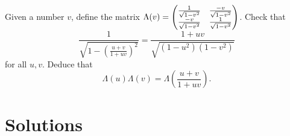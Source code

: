 \documentclass{article}
\begin{document}
\begin{Exercise}\label{exr:lorentz}
Given a number \(v\), define the matrix \(\Lambda(v)=\begin{pmatrix}
\frac{1}{\sqrt{1-v^2}} & \frac{-v}{\sqrt{1-v^2}}
\\ \frac{-v}{\sqrt{1-v^2}} & \frac{1}{\sqrt{1-v^2}}\end{pmatrix}\). Check that
\[\frac{1}{\sqrt{1-\left(\frac{u+v}{1+uv}\right)^2}}=\frac{1+uv}{\sqrt{(1-u^2)(1-v^2)}}\]
for all \(u,v\). Deduce that
\[\Lambda(u)\Lambda(v)=\Lambda\left(\frac{u+v}{1+uv}\right).\]


\end{Exercise}


\newpage


\setcounter{section}{1}
\section{Solutions}
\setcounter{section}{1}
\end{document}
